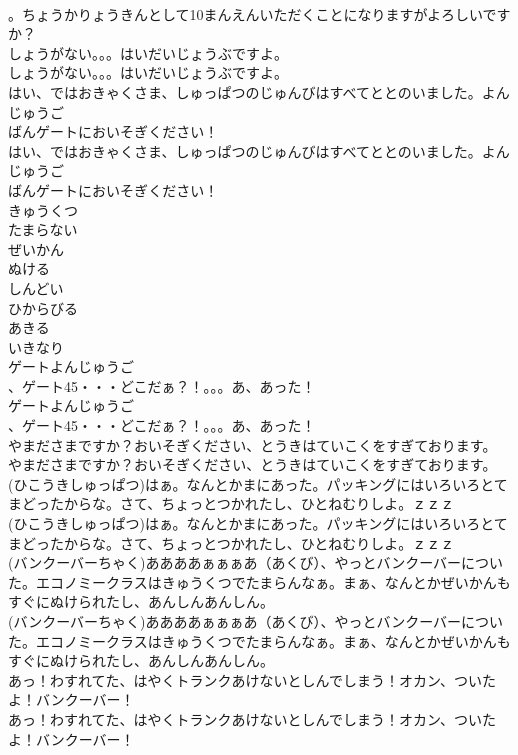 \documentclass[8pt]{extreport}
\begin{document}
\begin{CJK}{UTF8}{min}
\\	。ちょうかりょうきんとして10まんえんいただくことになりますがよろしいですか？ 
\\	しょうがない。。。はいだいじょうぶですよ。	
\\	しょうがない。。。はいだいじょうぶですよ。 
\\	はい、ではおきゃくさま、しゅっぱつのじゅんびはすべてととのいました。よんじゅうご
\\	ばんゲートにおいそぎください！	
\\	はい、ではおきゃくさま、しゅっぱつのじゅんびはすべてととのいました。よんじゅうご
\\	ばんゲートにおいそぎください！ 
\\	きゅうくつ
\\	たまらない
\\	ぜいかん
\\	ぬける
\\	しんどい
\\	ひからびる
\\	あきる
\\	いきなり
\\	ゲートよんじゅうご
\\	、ゲート45・・・どこだぁ？！。。。あ、あった！	
\\	ゲートよんじゅうご
\\	、ゲート45・・・どこだぁ？！。。。あ、あった！ 
\\	やまださまですか？おいそぎください、とうきはていこくをすぎております。	
\\	やまださまですか？おいそぎください、とうきはていこくをすぎております。 
\\	(ひこうきしゅっぱつ)はぁ。なんとかまにあった。パッキングにはいろいろとてまどったからな。さて、ちょっとつかれたし、ひとねむりしよ。ｚｚｚ	
\\	(ひこうきしゅっぱつ)はぁ。なんとかまにあった。パッキングにはいろいろとてまどったからな。さて、ちょっとつかれたし、ひとねむりしよ。ｚｚｚ 
\\	(バンクーバーちゃく)ああああぁぁぁあ（あくび）、やっとバンクーバーについた。エコノミークラスはきゅうくつでたまらんなぁ。まぁ、なんとかぜいかんもすぐにぬけられたし、あんしんあんしん。	
\\	(バンクーバーちゃく)ああああぁぁぁあ（あくび）、やっとバンクーバーについた。エコノミークラスはきゅうくつでたまらんなぁ。まぁ、なんとかぜいかんもすぐにぬけられたし、あんしんあんしん。 
\\	あっ！わすれてた、はやくトランクあけないとしんでしまう！オカン、ついたよ！バンクーバー！	
\\	あっ！わすれてた、はやくトランクあけないとしんでしまう！オカン、ついたよ！バンクーバー！ 

\end{CJK}
\end{document}
